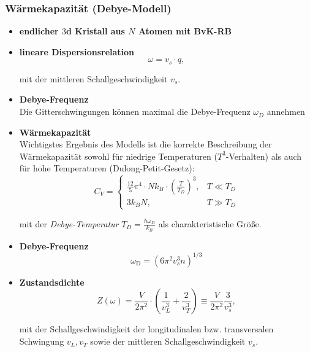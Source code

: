 \documentclass{article}
\newcommand{\lr}[1]{\left(#1\right)}
\begin{document}
\newpage


\subsubsection{Wärmekapazität (Debye-Modell)}
	\begin{itemize}		
		\item \textbf{endlicher $3$d Kristall aus $N$ Atomen mit BvK-RB}
		
		
		\item \textbf{lineare Dispersionsrelation}
			\begin{equation}
				\omega = v_s \cdot q,
			\end{equation}
		
		mit der mittleren Schallgeschwindigkeit $v_s$.
		

		\item \textbf{Debye-Frequenz}\\
		Die Gitterschwingungen können maximal die Debye-Frequenz $\omega_D$ annehmen
	\end{itemize}


	\begin{itemize}
		\item \textbf{Wärmekapazität}\\
		Wichtigstes Ergebnis des Modells ist die korrekte Beschreibung der Wärmekapazität sowohl für niedrige Temperaturen ($T^3$-Verhalten) als auch für hohe Temperaturen (Dulong-Petit-Gesetz):
			\begin{equation}
				C_V =
				\begin{cases}
					\frac{12}{5}\pi^4 \cdot N k_B \cdot \lr{ \frac{T}{T_D} }^3, & T \ll T_D \\
					3 k_B N, & T \gg T_D
				\end{cases}
			\end{equation}

		mit der \textit{Debye-Temperatur} $T_D = \frac{\hbar\omega_D}{k_B}$ als charakteristische Größe.
		
		
		\item \textbf{Debye-Frequenz}
			\begin{equation}
				\omega_\text{D} = (6\pi^2 v_s^3 n)^{1/3}
			\end{equation}
		
		
		\item \textbf{Zustandsdichte}
			\begin{equation}
				Z(\omega) = \frac{V}{2\pi^2} \cdot \lr{ \frac{1}{v_L^3} + \frac{2}{v_T^3} } \equiv \frac{V}{2\pi^2} \frac{3}{v_s^3},
			\end{equation}
		
		mit der Schallgeschwindigkeit der longitudinalen bzw. transversalen Schwingung $v_L, v_T$ sowie der mittleren Schallgeschwindigkeit $v_s$.
	\end{itemize}
\end{document}
